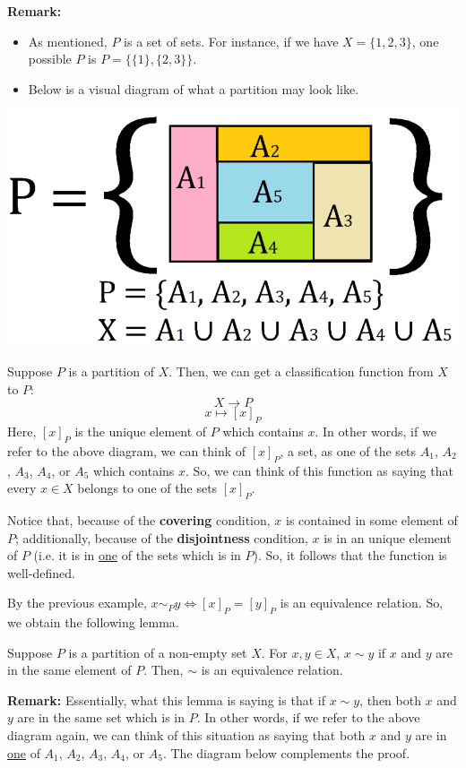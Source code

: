 \documentclass[letterpaper]{article}
\begin{document}
\textbf{Remark:}
\begin{itemize}
    \item As mentioned, $P$ is a set of sets. For instance, if we have $X = \{1, 2, 3\}$, one possible $P$ is $P = \{\{1\}, \{2, 3\}\}$.
    \item Below is a visual diagram of what a partition may look like.
\end{itemize}
\begin{center}
    \includegraphics[scale=0.4]{assets/partition.PNG}
\end{center}

Suppose $P$ is a partition of $X$. Then, we can get a classification function from $X$ to $P$:
\[X \to P\]
\[x \mapsto [x]_P\]
Here, $[x]_P$ is the unique element of $P$ which contains $x$. In other words, if we refer to the above diagram, we can think of $[x]_P$, a set, as one of the sets $A_1$, $A_2$, $A_3$, $A_4$, or $A_5$ which contains $x$. So, we can think of this function as saying that every $x \in X$ belongs to one of the sets $[x]_P$. 

\bigskip 

Notice that, because of the \textbf{covering} condition, $x$ is contained in some element of $P$; additionally, because of the \textbf{disjointness} condition, $x$ is in an unique element of $P$ (i.e. it is in \underline{one} of the sets which is in $P$). So, it follows that the function is well-defined. 

\bigskip 

By the previous example, $x \sim_P y \iff [x]_P = [y]_P$ is an equivalence relation. So, we obtain the following lemma. 
\begin{lemma}{}{}
    Suppose $P$ is a partition of a non-empty set $X$. For $x, y \in X$, $x \sim y$ if $x$ and $y$ are in the same element of $P$. Then, $\sim$ is an equivalence relation.
\end{lemma}
\textbf{Remark:} Essentially, what this lemma is saying is that if $x \sim y$, then both $x$ and $y$ are in the same set which is in $P$. In other words, if we refer to the above diagram again, we can think of this situation as saying that both $x$ and $y$ are in \underline{one} of $A_1$, $A_2$, $A_3$, $A_4$, or $A_5$. The diagram below complements the proof.
\end{document}
